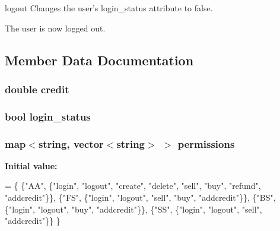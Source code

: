 logout Changes the user's login\-\_\-status attribute to false. 

The user is now logged out. 

\subsection{Member Data Documentation}
\hypertarget{class_user_aa559c3686bb9d38c3335c16bbea07be8}{
\subsubsection[{credit}]{\setlength{\rightskip}{0pt plus 5cm}double credit\hspace{0.3cm}{\ttfamily [private]}}}\label{class_user_aa559c3686bb9d38c3335c16bbea07be8}
\hypertarget{class_user_a31c707cfc594c5ea9c710f9a8986401b}{
\subsubsection[{login\-\_\-status}]{\setlength{\rightskip}{0pt plus 5cm}bool login\-\_\-status\hspace{0.3cm}{\ttfamily [private]}}}\label{class_user_a31c707cfc594c5ea9c710f9a8986401b}
\hypertarget{class_user_a57334f6c157620be2c10904a5025fc88}{
\subsubsection[{permissions}]{\setlength{\rightskip}{0pt plus 5cm}map$<$string, vector$<$string$>$ $>$ permissions\hspace{0.3cm}{\ttfamily [private]}}}\label{class_user_a57334f6c157620be2c10904a5025fc88}
{\bfseries Initial value\-:}
\begin{DoxyCode}
= \{
        \{\textcolor{stringliteral}{"AA"}, \{\textcolor{stringliteral}{"login"}, \textcolor{stringliteral}{"logout"}, \textcolor{stringliteral}{"create"}, \textcolor{stringliteral}{"delete"}, \textcolor{stringliteral}{"sell"}, \textcolor{stringliteral}{"buy"}, \textcolor{stringliteral}{"refund"}, \textcolor{stringliteral}{"addcredit"}\}\},
        \{\textcolor{stringliteral}{"FS"}, \{\textcolor{stringliteral}{"login"}, \textcolor{stringliteral}{"logout"}, \textcolor{stringliteral}{"sell"}, \textcolor{stringliteral}{"buy"}, \textcolor{stringliteral}{"addcredit"}\}\},
        \{\textcolor{stringliteral}{"BS"}, \{\textcolor{stringliteral}{"login"}, \textcolor{stringliteral}{"logout"}, \textcolor{stringliteral}{"buy"}, \textcolor{stringliteral}{"addcredit"}\}\},
        \{\textcolor{stringliteral}{"SS"}, \{\textcolor{stringliteral}{"login"}, \textcolor{stringliteral}{"logout"}, \textcolor{stringliteral}{"sell"}, \textcolor{stringliteral}{"addcredit"}\}\}
    \}
\end{DoxyCode}


